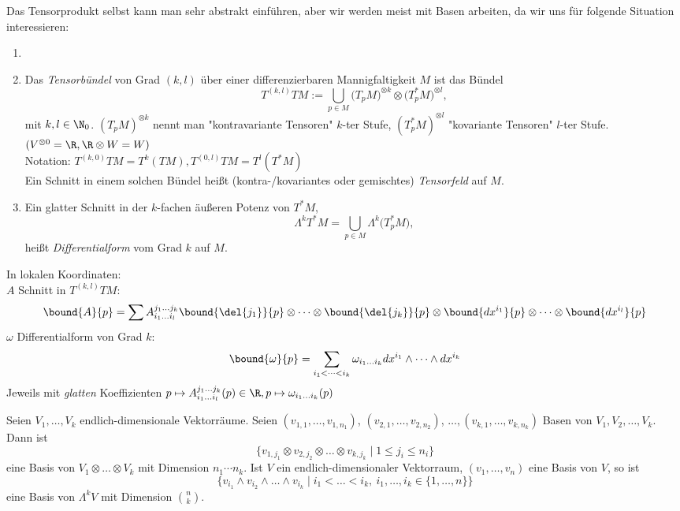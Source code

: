 \begin{rem*}
	Das Tensorprodukt selbst kann man sehr abstrakt einführen, aber wir werden meist mit Basen arbeiten, da wir uns für folgende Situation interessieren:
\end{rem*}

\begin{defn}
	\begin{enumerate}[label= {\roman*})]
		\item[]
		\item Das \emph{Tensorbündel} von Grad $(k,l)$ über einer differenzierbaren Mannigfaltigkeit $M$ ist das Bündel
			\[ T^{(k,l)} TM := \bigcup_{p \in M} \big(T_pM\big)^{\otimes k} \otimes \big(T_p^*M\big)^{\otimes l}, \]
			mit $k,l \in \N_0$. $(T_pM)^{\otimes k}$ nennt man "kontravariante Tensoren" $k$-ter Stufe, $(T_p^*M)^{\otimes l}$ "kovariante Tensoren" $l$-ter Stufe.\hspace{\fill} $ (V^{\otimes 0} = \R, \R \otimes W = W) $\\
			Notation: $ T^{(k,0)} TM = T^k(TM), T^{(0,l)}TM = T^l(T^*M) $\\
			Ein Schnitt in einem solchen Bündel heißt (kontra-/kovariantes oder gemischtes) \emph{Tensorfeld} auf $M$.
		\item Ein glatter Schnitt in der $k$-fachen äußeren Potenz von $T^*M$,
			\[ \Lambda^kT^*M = \bigcup_{p \in M} \Lambda^k \big(T_p^*M\big), \]
			heißt \emph{Differentialform} vom Grad $k$ auf $M$.
	\end{enumerate}
\end{defn}

\begin{rem*}
	In lokalen Koordinaten:\\
	$A$ Schnitt in $T^{(k,l)}TM:$
	\[ \bound{A}{p} = \sum A_{i_1\dots i_l}^{j_1\dots j_k} \bound{\del{j_1}}{p} \otimes \dots \otimes \bound{\del{j_k}}{p} \otimes \bound{dx^{i_1}}{p} \otimes \dots \otimes \bound{dx^{i_l}}{p} \]
	$\omega$ Differentialform von Grad $k$:
	\[ \bound{\omega}{p} = \sum_{i_1 < \dots < i_k} \omega _{i_1\dots i_k} dx^{i_1} \wedge \dots \wedge dx^{i_k} \]
	Jeweils mit \emph{glatten} Koeffizienten $ p \mapsto A_{i_1\dots i_l}^{j_1\dots j_k}(p) \in \R, p \mapsto \omega_{i_1\dots i_k}(p) $
\end{rem*}

\begin{lem}
	Seien $ V_1,\dotsc,V_k $ endlich-dimensionale Vektorräume. Seien $ (v_{1,1}, \dotsc, v_{1,n_1})$, $(v_{2,1}, \dotsc, v_{2,n_2})$, $\dotsc, (v_{k,1}, \dotsc, v_{k,n_k}) $ Basen von $V_1,V_2,\dotsc,V_k$. Dann ist
	\[ \big\{ v_{1,j_1} \otimes v_{2,j_2} \otimes \dots \otimes v_{k,j_k} \mid 1 \leq j_i \leq n_i \big\} \]
	eine Basis von $V_1 \otimes \dots \otimes V_k$ mit Dimension $n_1 \dotsm n_k$. Ist $V$ ein endlich-dimensionaler Vektorraum, $ (v_1,\dotsc,v_n) $ eine Basis von $V$, so ist
	\[ \big\{ v_{i_1} \wedge v_{i_2} \wedge \dots \wedge v_{i_k} \mid i_1 < \dots < i_k,\ i_1,\dotsc,i_k \in \{1,\dotsc,n\} \big\} \]
	eine Basis von $\Lambda^kV$ mit Dimension $\binom{n}{k}$.
\end{lem}

